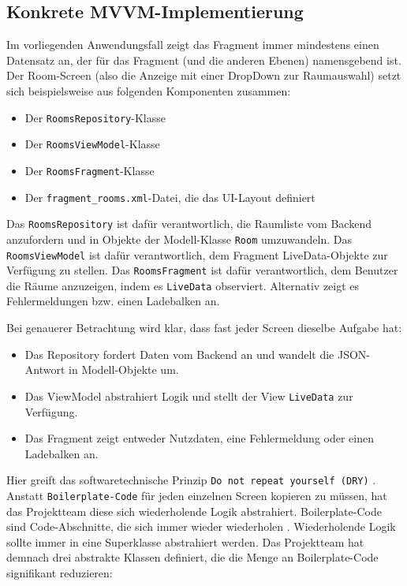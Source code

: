 \hypertarget{konkrete-mvvm-implementierung}{%
\subsection{Konkrete
MVVM-Implementierung}\label{konkrete-mvvm-implementierung}}

Im vorliegenden Anwendungsfall zeigt das Fragment immer mindestens einen
Datensatz an, der für das Fragment (und die anderen Ebenen) namensgebend
ist. Der Room-Screen (also die Anzeige mit einer DropDown zur
Raumauswahl) setzt sich beispielsweise aus folgenden Komponenten
zusammen:

\begin{itemize}
\tightlist
\item
  Der \texttt{RoomsRepository}-Klasse
\item
  Der \texttt{RoomsViewModel}-Klasse
\item
  Der \texttt{RoomsFragment}-Klasse
\item
  Der \texttt{fragment\_rooms.xml}-Datei, die das UI-Layout definiert
\end{itemize}

Das \texttt{RoomsRepository} ist dafür verantwortlich, die Raumliste vom
Backend anzufordern und in Objekte der Modell-Klasse \texttt{Room}
umzuwandeln. Das \texttt{RoomsViewModel} ist dafür verantwortlich, dem
Fragment LiveData-Objekte zur Verfügung zu stellen. Das
\texttt{RoomsFragment} ist dafür verantwortlich, dem Benutzer die Räume
anzuzeigen, indem es \texttt{LiveData} observiert. Alternativ zeigt es
Fehlermeldungen bzw. einen Ladebalken an.

Bei genauerer Betrachtung wird klar, dass fast jeder Screen dieselbe
Aufgabe hat:

\begin{itemize}
\tightlist
\item
  Das Repository fordert Daten vom Backend an und wandelt die
  JSON-Antwort in Modell-Objekte um.
\item
  Das ViewModel abstrahiert Logik und stellt der View \texttt{LiveData}
  zur Verfügung.
\item
  Das Fragment zeigt entweder Nutzdaten, eine Fehlermeldung oder einen
  Ladebalken an.
\end{itemize}

Hier greift das softwaretechnische Prinzip
\texttt{Do\ not\ repeat\ yourself\ (DRY)} \cite{dry}. Anstatt
\texttt{Boilerplate-Code} für jeden einzelnen Screen kopieren zu müssen,
hat das Projektteam diese sich wiederholende Logik abstrahiert.
Boilerplate-Code sind Code-Abschnitte, die sich immer wieder wiederholen
\cite{boiler}. Wiederholende Logik sollte immer in eine Superklasse
abstrahiert werden. Das Projektteam hat demnach drei abstrakte Klassen
definiert, die die Menge an Boilerplate-Code signifikant reduzieren:

